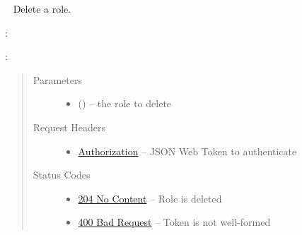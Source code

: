 \documentclass[letterpaper,10pt,english]{sphinxmanual}
\begin{document}
\begin{fulllineitems}
\label{\detokenize{resources/role:delete--roles-(role_id)}}~
Delete a role.

:

\begin{sphinxVerbatim}[commandchars=\\\{\}]
  
 
 
\end{sphinxVerbatim}

:

\begin{sphinxVerbatim}[commandchars=\\\{\}]
  
\end{sphinxVerbatim}
\begin{quote}\begin{description}
\item[{Parameters}] \leavevmode\begin{itemize}
\item {} 
 () -- the role to delete

\end{itemize}

\item[{Request Headers}] \leavevmode\begin{itemize}
\item {} 
\href{http://tools.ietf.org/html/rfc7235\#section-4.2}{Authorization} -- JSON Web Token to authenticate

\end{itemize}

\item[{Status Codes}] \leavevmode\begin{itemize}
\item {} 
\href{http://www.w3.org/Protocols/rfc2616/rfc2616-sec10.html\#sec10.2.5}{204 No Content} -- Role is deleted

\item {} 
\href{http://www.w3.org/Protocols/rfc2616/rfc2616-sec10.html\#sec10.4.1}{400 Bad Request} -- Token is not well-formed


\end{itemize}
\end{description}
\end{quote}
\end{fulllineitems}
\end{document}
